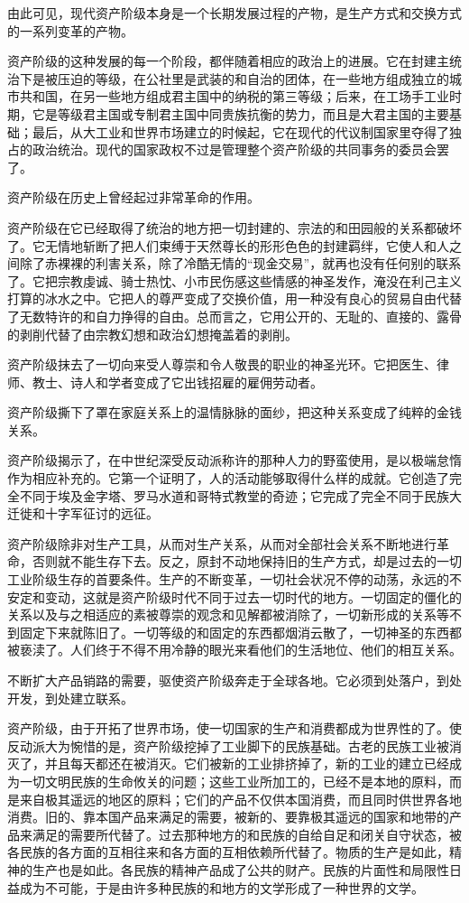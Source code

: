 \documentclass[10pt, UTF8]{book} %
\begin{document}
由此可见，现代资产阶级本身是一个长期发展过程的产物，是生产方式和交换方式的一系列变革的产物。

资产阶级的这种发展的每一个阶段，都伴随着相应的政治上的进展。它在封建主统治下是被压迫的等级，在公社里是武装的和自治的团体，在一些地方组成独立的城市共和国，在另一些地方组成君主国中的纳税的第三等级；后来，在工场手工业时期，它是等级君主国或专制君主国中同贵族抗衡的势力，而且是大君主国的主要基础；最后，从大工业和世界市场建立的时候起，它在现代的代议制国家里夺得了独占的政治统治。现代的国家政权不过是管理整个资产阶级的共同事务的委员会罢了。

资产阶级在历史上曾经起过非常革命的作用。

资产阶级在它已经取得了统治的地方把一切封建的、宗法的和田园般的关系都破坏了。它无情地斩断了把人们束缚于天然尊长的形形色色的封建羁绊，它使人和人之间除了赤裸裸的利害关系，除了冷酷无情的“现金交易”，就再也没有任何别的联系了。它把宗教虔诚、骑士热忱、小市民伤感这些情感的神圣发作，淹没在利己主义打算的冰水之中。它把人的尊严变成了交换价值，用一种没有良心的贸易自由代替了无数特许的和自力挣得的自由。总而言之，它用公开的、无耻的、直接的、露骨的剥削代替了由宗教幻想和政治幻想掩盖着的剥削。

资产阶级抹去了一切向来受人尊崇和令人敬畏的职业的神圣光环。它把医生、律师、教士、诗人和学者变成了它出钱招雇的雇佣劳动者。

资产阶级撕下了罩在家庭关系上的温情脉脉的面纱，把这种关系变成了纯粹的金钱关系。

资产阶级揭示了，在中世纪深受反动派称许的那种人力的野蛮使用，是以极端怠惰作为相应补充的。它第一个证明了，人的活动能够取得什么样的成就。它创造了完全不同于埃及金字塔、罗马水道和哥特式教堂的奇迹；它完成了完全不同于民族大迁徙和十字军征讨的远征。

资产阶级除非对生产工具，从而对生产关系，从而对全部社会关系不断地进行革命，否则就不能生存下去。反之，原封不动地保持旧的生产方式，却是过去的一切工业阶级生存的首要条件。生产的不断变革，一切社会状况不停的动荡，永远的不安定和变动，这就是资产阶级时代不同于过去一切时代的地方。一切固定的僵化的关系以及与之相适应的素被尊崇的观念和见解都被消除了，一切新形成的关系等不到固定下来就陈旧了。一切等级的和固定的东西都烟消云散了，一切神圣的东西都被亵渎了。人们终于不得不用冷静的眼光来看他们的生活地位、他们的相互关系。

不断扩大产品销路的需要，驱使资产阶级奔走于全球各地。它必须到处落户，到处开发，到处建立联系。

资产阶级，由于开拓了世界市场，使一切国家的生产和消费都成为世界性的了。使反动派大为惋惜的是，资产阶级挖掉了工业脚下的民族基础。古老的民族工业被消灭了，并且每天都还在被消灭。它们被新的工业排挤掉了，新的工业的建立已经成为一切文明民族的生命攸关的问题；这些工业所加工的，已经不是本地的原料，而是来自极其遥远的地区的原料；它们的产品不仅供本国消费，而且同时供世界各地消费。旧的、靠本国产品来满足的需要，被新的、要靠极其遥远的国家和地带的产品来满足的需要所代替了。过去那种地方的和民族的自给自足和闭关自守状态，被各民族的各方面的互相往来和各方面的互相依赖所代替了。物质的生产是如此，精神的生产也是如此。各民族的精神产品成了公共的财产。民族的片面性和局限性日益成为不可能，于是由许多种民族的和地方的文学形成了一种世界的文学。
\end{document}
